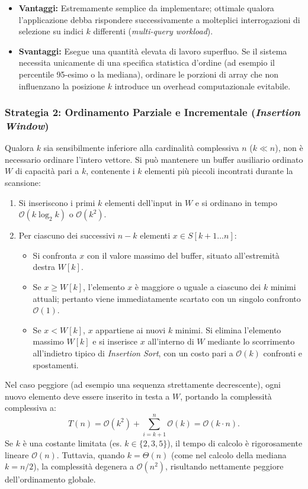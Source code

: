 \begin{itemize}
  \item \textbf{Vantaggi:} Estremamente semplice da implementare; ottimale qualora l'applicazione debba rispondere successivamente a molteplici interrogazioni di selezione su indici $k$ differenti (\textit{multi-query workload}).
  \item \textbf{Svantaggi:} Esegue una quantità elevata di lavoro superfluo. Se il sistema necessita unicamente di una specifica statistica d'ordine (ad esempio il percentile 95-esimo o la mediana), ordinare le porzioni di array che non influenzano la posizione $k$ introduce un overhead computazionale evitabile.
\end{itemize}

\subsubsection{Strategia 2: Ordinamento Parziale e Incrementale (\textit{Insertion Window})}
Qualora $k$ sia sensibilmente inferiore alla cardinalità complessiva $n$ ($k \ll n$), non è necessario ordinare l'intero vettore. Si può mantenere un buffer ausiliario ordinato $W$ di capacità pari a $k$, contenente i $k$ elementi più piccoli incontrati durante la scansione:

\begin{enumerate}
  \item Si inseriscono i primi $k$ elementi dell'input in $W$ e si ordinano in tempo $\mathcal{O}(k \log_2 k)$ o $\mathcal{O}(k^2)$.
  \item Per ciascuno dei successivi $n - k$ elementi $x \in S[k+1 \dots n]$:
  \begin{itemize}
    \item Si confronta $x$ con il valore massimo del buffer, situato all'estremità destra $W[k]$.
    \item Se $x \ge W[k]$, l'elemento $x$ è maggiore o uguale a ciascuno dei $k$ minimi attuali; pertanto viene immediatamente scartato con un singolo confronto $\mathcal{O}(1)$.
    \item Se $x < W[k]$, $x$ appartiene ai nuovi $k$ minimi. Si elimina l'elemento massimo $W[k]$ e si inserisce $x$ all'interno di $W$ mediante lo scorrimento all'indietro tipico di \textit{Insertion Sort}, con un costo pari a $\mathcal{O}(k)$ confronti e spostamenti.
  \end{itemize}
\end{enumerate}

Nel caso peggiore (ad esempio una sequenza strettamente decrescente), ogni nuovo elemento deve essere inserito in testa a $W$, portando la complessità complessiva a:
\begin{equation}
  T(n) = \mathcal{O}(k^2) + \sum_{i=k+1}^n \mathcal{O}(k) = \mathcal{O}(k \cdot n).
\end{equation}
Se $k$ è una costante limitata (es. $k \in \{2, 3, 5\}$), il tempo di calcolo è rigorosamente lineare $\mathcal{O}(n)$. Tuttavia, quando $k = \Theta(n)$ (come nel calcolo della mediana $k = n/2$), la complessità degenera a $\mathcal{O}(n^2)$, risultando nettamente peggiore dell'ordinamento globale.


